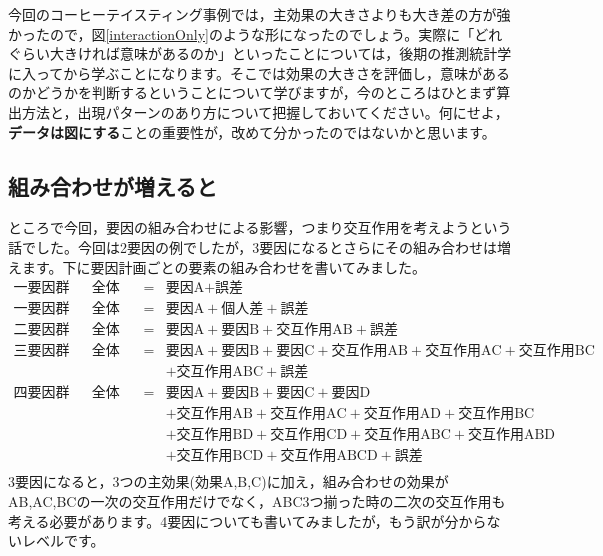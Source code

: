 \documentclass{ltjbook}
\begin{document}
今回のコーヒーテイスティング事例では，主効果の大きさよりも大き差の方が強かったので，図\ref{interactionOnly}のような形になったのでしょう。実際に「どれぐらい大きければ意味があるのか」といったことについては，後期の推測統計学に入ってから学ぶことになります。そこでは効果の大きさを評価し，意味があるのかどうかを判断するということについて学びますが，今のところはひとまず算出方法と，出現パターンのあり方について把握しておいてください。何にせよ，\textbf{データは図にする}ことの重要性が，改めて分かったのではないかと思います。


\subsection{組み合わせが増えると}
ところで今回，要因の組み合わせによる影響，つまり交互作用を考えようという話でした。今回は2要因の例でしたが，3要因になるとさらにその組み合わせは増えます。下に要因計画ごとの要素の組み合わせを書いてみました。
\[
	\begin{array}{llll}
		\mbox{一要因群間計画} & \mbox{全体変動} & = & \mbox{要因A} + \mbox{誤差}                                                          \\
		\mbox{一要因群内計画} & \mbox{全体変動} & = & \mbox{要因A} + \mbox{個人差} + \mbox{誤差}                                             \\
		\mbox{二要因群間計画} & \mbox{全体変動} & = & \mbox{要因A} + \mbox{要因B} +\mbox{交互作用AB} +\mbox{誤差}                               \\
		\mbox{三要因群間計画} & \mbox{全体変動} & = & \mbox{要因A} + \mbox{要因B} + \mbox{要因C}+\mbox{交互作用AB} +\mbox{交互作用AC}+\mbox{交互作用BC} \\
		               &             &   & +\mbox{交互作用ABC}  +\mbox{誤差}                                                     \\
		\mbox{四要因群間計画} & \mbox{全体変動} & = & \mbox{要因A} + \mbox{要因B} + \mbox{要因C} + \mbox{要因D}                               \\
		               &             &   & + \mbox{交互作用AB} +\mbox{交互作用AC} +\mbox{交互作用AD}+\mbox{交互作用BC}                     \\
		               &             &   & +\mbox{交互作用BD} +\mbox{交互作用CD}+\mbox{交互作用ABC}+\mbox{交互作用ABD}                     \\
		               &             &   & +\mbox{交互作用BCD} +\mbox{交互作用ABCD} +\mbox{誤差}                                     \\
	\end{array}
\]
3要因になると，3つの主効果(効果A,B,C)に加え，組み合わせの効果がAB,AC,BCの一次の交互作用だけでなく，ABC3つ揃った時の二次の交互作用も考える必要があります。4要因についても書いてみましたが，もう訳が分からないレベルです。
\end{document}
